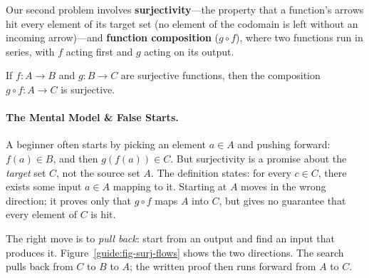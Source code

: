 Our second problem involves \textbf{surjectivity}---the property that a function's arrows hit every element of its target set (no element of the codomain is left without an incoming arrow)---and \textbf{function composition} ($g \circ f$), where two functions run in series, with $f$ acting first and $g$ acting on its output.

\begin{theorem}
If $f: A \to B$ and $g: B \to C$ are surjective functions, then the composition $g \circ f: A \to C$ is surjective.
\end{theorem}

\paragraph{The Mental Model \& False Starts.}
A beginner often starts by picking an element $a \in A$ and pushing forward: $f(a) \in B$, and then $g(f(a)) \in C$. But surjectivity is a promise about the \emph{target} set $C$, not the source set $A$. The definition states: for every $c \in C$, there exists some input $a \in A$ mapping to it. Starting at $A$ moves in the wrong direction; it proves only that $g \circ f$ maps $A$ into $C$, but gives no guarantee that every element of $C$ is hit.

The right move is to \emph{pull back}: start from an output and find an input that produces it. Figure~\ref{guide:fig-surj-flows} shows the two directions. The search pulls back from $C$ to $B$ to $A$; the written proof then runs forward from $A$ to $C$.


